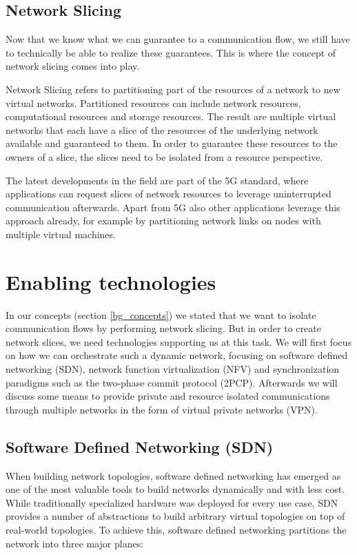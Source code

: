 \subsection{Network Slicing}
Now that we know what we can guarantee to a communication flow, we still have to technically be able to realize these guarantees. This is where the concept of network slicing comes into play.

Network Slicing \cite{slicing} refers to partitioning part of the resources of a network to new virtual networks. Partitioned resources can include network resources, computational resources and storage resources. The result are multiple virtual networks that each have a slice of the resources of the underlying network available and guaranteed to them. In order to guarantee these resources to the owners of a slice, the slices need to be isolated from a resource perspective.

The latest developments in the field are part of the 5G standard, where applications can request slices of network resources to leverage uninterrupted communication afterwards. Apart from 5G also other applications leverage this approach already, for example by partitioning network links on nodes with multiple virtual machines.

\section{Enabling technologies}
In our concepts (section \ref{bg_concepts}) we stated that we want to isolate communication flows by performing network slicing. But in order to create network slices, we need technologies supporting us at this task. We will first focus on how we can orchestrate such a dynamic network, focusing on software defined networking (SDN), network function virtualization (NFV) and synchronization paradigms such as the two-phase commit protocol (2PCP). Afterwards we will discuss some means to provide private and resource isolated communications through multiple networks in the form of virtual private networks (VPN).

\subsection{Software Defined Networking (SDN)}
When building network topologies, software defined networking \cite{sdn} has emerged as one of the most valuable tools to build networks dynamically and with less cost.
While traditionally specialized hardware was deployed for every use case, SDN provides a number of abstractions to build arbitrary virtual topologies on top of real-world topologies.
To achieve this, software defined networking partitions the network into three major planes:

